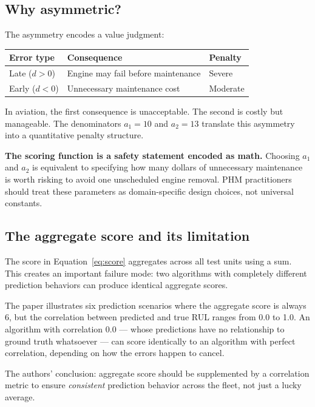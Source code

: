 \documentclass[11pt, a4paper]{article}
\begin{document}
\subsection{Why asymmetric?}

The asymmetry encodes a value judgment:

\begin{center}
\begin{tabular}{@{}lll@{}}
  \toprule
  Error type & Consequence & Penalty \\
  \midrule
  Late ($d > 0$) & Engine may fail before maintenance & Severe \\
  Early ($d < 0$) & Unnecessary maintenance cost & Moderate \\
  \bottomrule
\end{tabular}
\end{center}

In aviation, the first consequence is unacceptable. The second is
costly but manageable. The denominators $a_1 = 10$ and $a_2 = 13$
translate this asymmetry into a quantitative penalty structure.

\begin{insightbox}
\textbf{The scoring function is a safety statement encoded as math.}
Choosing $a_1$ and $a_2$ is equivalent to specifying how many
dollars of unnecessary maintenance is worth risking to avoid one
unscheduled engine removal. PHM practitioners should treat these
parameters as domain-specific design choices, not universal constants.
\end{insightbox}

\subsection{The aggregate score and its limitation}

The score in Equation~\eqref{eq:score} aggregates across all test
units using a sum. This creates an important failure mode: two
algorithms with completely different prediction behaviors can produce
identical aggregate scores.

The paper illustrates six prediction scenarios where the aggregate
score is always 6, but the correlation between predicted and true
RUL ranges from 0.0 to 1.0. An algorithm with correlation 0.0 ---
whose predictions have no relationship to ground truth whatsoever ---
can score identically to an algorithm with perfect correlation,
depending on how the errors happen to cancel.

The authors' conclusion: aggregate score should be supplemented by
a correlation metric to ensure \emph{consistent} prediction behavior
across the fleet, not just a lucky average.
\end{document}

